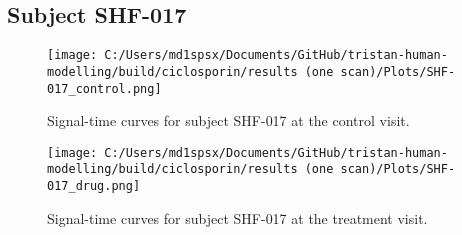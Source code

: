 \documentclass{epflreport}%
\begin{document}
\subsection{Subject SHF{-}017}%
\label{subsec:SubjectSHF{-}017}%

%


\begin{figure}[h!]%
\centering%
\texttt{[image: C:/Users/md1spsx/Documents/GitHub/tristan-human-modelling/build/ciclosporin/results (one scan)/Plots/SHF-017\_control.png]}%
\caption{Signal{-}time curves for subject SHF{-}017 at the control visit.}%
\end{figure}

%


\begin{figure}[h!]%
\centering%
\texttt{[image: C:/Users/md1spsx/Documents/GitHub/tristan-human-modelling/build/ciclosporin/results (one scan)/Plots/SHF-017\_drug.png]}%
\caption{Signal{-}time curves for subject SHF{-}017 at the treatment visit.}%
\end{figure}
\end{document}
